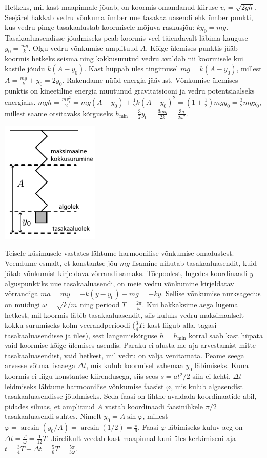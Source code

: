 \documentclass[11pt, twoside]{article}
\begin{document}
{{\ifSolution
\osa Hetkeks, mil kast maapinnale jõuab, on koormis omandanud kiiruse $v_i=\sqrt{2gh}$. Seejärel hakkab vedru võnkuma ümber uue tasakaaluasendi ehk ümber punkti, kus vedru pinge tasakaalustab koormisele mõjuva raskusjõu: $ky_0=mg$. Tasakaaluasendisse jõudmiseks peab koormis veel täiendavalt läbima kauguse $y_0=\frac{mg}{k}$. Olgu vedru võnkumise amplituud $A$. Kõige ülemises punktis jääb koormis hetkeks seisma ning kokkusurutud vedru avaldab nii koormisele kui kastile jõudu $k(A-y_0)$. Kast hüppab üles tingimusel $mg = k(A-y_0)$, millest $A = \frac{mg}{k}+y_0 =2y_0$. Rakendame nüüd energia jäävust. Võnkumise ülemises punktis on kineetiline energia muutunud gravitatsiooni ja vedru potentsiaalseks energiaks. $mgh=\frac{mv_i^2}{2} = mg(A-y_0) + \frac{1}{2}k(A-y_0)^2 = \left(1+ \frac{1}{2}\right)mgy_0 = \frac{3}{2}mgy_0$, millest saame otsitavaks kõrguseks $h_\text{min} = \frac{3}{2}y_0 = \frac{3mg}{2k} = \frac{3g}{2\omega^2}$.\\
\begin{center}
\includegraphics[width=0.35\textwidth]{2015-v3g-08-vedruJoonis_v2.pdf}
\end{center}
\osa Teisele küsimusele vastates lähtume harmoonilise võnkumise omadustest. Veendume esmalt, et konstantse jõu $mg$ lisamine nihutab tasakaaluasendit, kuid jätab võnkumist kirjeldava võrrandi samaks. Tõepoolest, lugedes koordinaadi $y$ alguspunktiks uue tasakaaluasendi, on meie vedru võnkumine kirjeldatav võrrandiga $ma = m \ddot{y} = -k(y-y_0) - mg = -ky$. Sellise võnkumise nurksagedus on muidugi $\omega=\sqrt{k/m}$ ning periood $T=\frac{2\pi}{\omega}$. Kui hakkaksime aega lugema hetkest, mil koormis läbib tasakaaluasendit, siis kuluks vedru maksimaalselt kokku surumiseks kolm veerandperioodi ($\frac{3}{4}T$: kast liigub alla, tagasi tasakaaluasendisse ja üles), sest langemiskõrguse $h=h_\text{min}$ korral saab kast hüpata vaid koormise kõige ülemises asendis. Paraku ei alusta me aja arvestamist mitte tasakaaluasendist, vaid hetkest, mil vedru on välja venitamata. Peame seega arvesse võtma lisaaega $\Delta t$, mis kulub koormisel vahemaa $y_0$ läbimiseks. Kuna koormis ei liigu konstantse kiirendusega, siis seos $s=at^2/2$ siin ei kehti. $\Delta t$ leidmiseks lähtume harmoonilise võnkumise faasist $\varphi$, mis kulub algasendist tasakaaluasendisse jõudmiseks. Seda faasi on lihtne avaldada koordinaatide abil, pidades silmas, et amplituud $A$ vastab koordinaadi faasinihkele $\pi/2$ tasakaaluasendi suhtes. Nimelt $y_0=A\sin\varphi$, millest $\varphi = \arcsin(y_0/A) = \arcsin(1/2) = \frac{\pi}{6}$. Faasi $\varphi$ läbimiseks kuluv aeg on $\Delta t = \frac{\varphi}{\omega}=\frac{1}{12}T$. Järelikult veedab kast maapinnal kuni üles kerkimiseni aja $t = \frac{3}{4}T + \Delta t = \frac{5}{6}T = \frac{5\pi}{3\omega}$.
}}
\end{document}
